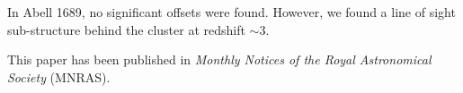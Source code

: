 In Abell 1689, no significant offsets were found. However,  
we found a line of sight sub-structure behind the cluster at
redshift $\sim 3$. 

This paper has been published in {\it Monthly Notices of the Royal Astronomical
Society} (MNRAS). 



\clearpage
